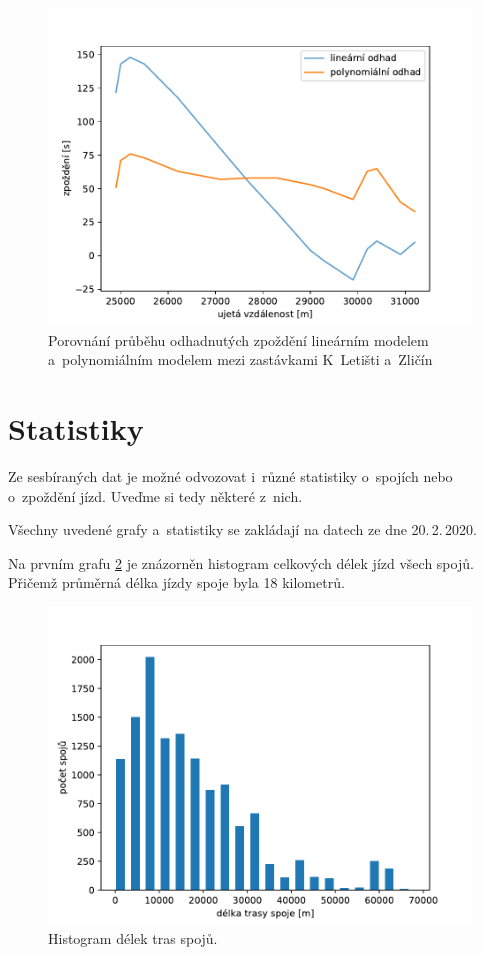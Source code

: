 \begin{figure}
   \centering
 \includegraphics[width=1\linewidth]{../img/compare_534_421}
 \caption{Porovnání průběhu odhadnutých zpoždění lineárním modelem a~polynomiálním modelem mezi zastávkami K~Letišti a~Zličín}
 \label{fig:compare_534_421}
\end{figure}


\section{Statistiky} \label{section:stats}

Ze sesbíraných dat je možné odvozovat i~různé statistiky o~spojích nebo o~zpoždění jízd. Uveďme si tedy některé z~nich.

\bigbreak

Všechny uvedené grafy a~statistiky se zakládají na datech ze dne 20.\,2.\,2020.


\bigbreak

Na prvním grafu \ref{fig:trips_len} je znázorněn histogram celkových délek jízd všech spojů. Přičemž průměrná délka jízdy spoje byla 18 kilometrů.

\begin{figure}
   \centering
 \includegraphics[width=1\linewidth]{../img/trips_len}
 \caption{Histogram délek tras spojů.}
 \label{fig:trips_len}
\end{figure}


